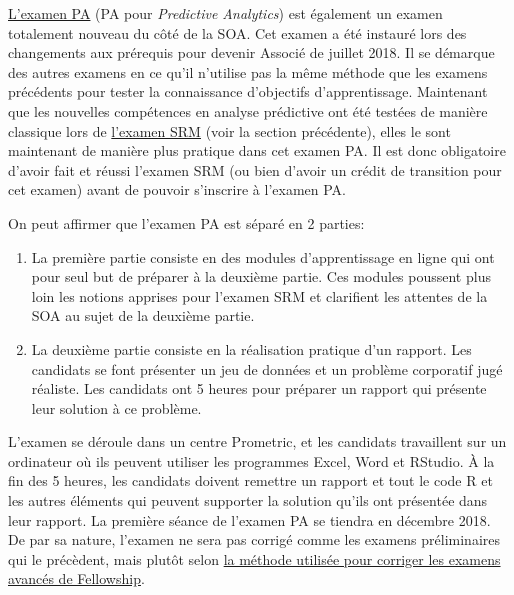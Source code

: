 \href{https://www.soa.org/Education/Exam-Req/edu-exam-pa-detail.aspx}{L'examen PA} (PA pour \textit{Predictive Analytics}) est également un examen totalement nouveau du côté de la SOA. Cet examen a été instauré lors des changements aux prérequis pour devenir Associé de juillet 2018. Il se démarque des autres examens en ce qu'il n'utilise pas la même méthode que les examens précédents pour tester la connaissance d'objectifs d'apprentissage. Maintenant que les nouvelles compétences en analyse prédictive ont été testées de manière classique lors de \href{https://www.soa.org/Education/Exam-Req/edu-exam-srm-detail.aspx}{l'examen SRM} (voir la section précédente), elles le sont maintenant de manière plus pratique dans cet examen PA. Il est donc obligatoire d'avoir fait et réussi l'examen SRM (ou bien d'avoir un crédit de transition pour cet examen) avant de pouvoir s'inscrire à l'examen PA. \vspace{\baselineskip}

On peut affirmer que l'examen PA est séparé en 2 parties:
\begin{enumerate}
\item La première partie consiste en des modules d'apprentissage en ligne qui ont pour seul but de préparer à la deuxième partie. Ces modules poussent plus loin les notions apprises pour l'examen SRM et clarifient les attentes de la SOA au sujet de la deuxième partie.
\item La deuxième partie consiste en la réalisation pratique d'un rapport. Les candidats se font présenter un jeu de données et un problème corporatif jugé réaliste. Les candidats ont 5 heures pour préparer un rapport qui présente leur solution à ce problème.
\end{enumerate}
\vspace{\baselineskip}

L'examen se déroule dans un centre Prometric, et les candidats travaillent sur un ordinateur où ils peuvent utiliser les programmes Excel, Word et RStudio. À la fin des 5 heures, les candidats doivent remettre un rapport et tout le code R et les autres éléments qui peuvent supporter la solution qu'ils ont présentée dans leur rapport. La première séance de l'examen PA se tiendra en décembre 2018. De par sa nature, l'examen ne sera pas corrigé comme les examens préliminaires qui le précèdent, mais plutôt selon \href{https://www.soa.org/Education/General-Info/edu-guide-written-exams-seminar-vids.aspx}{la méthode utilisée pour corriger les examens avancés de Fellowship}.

